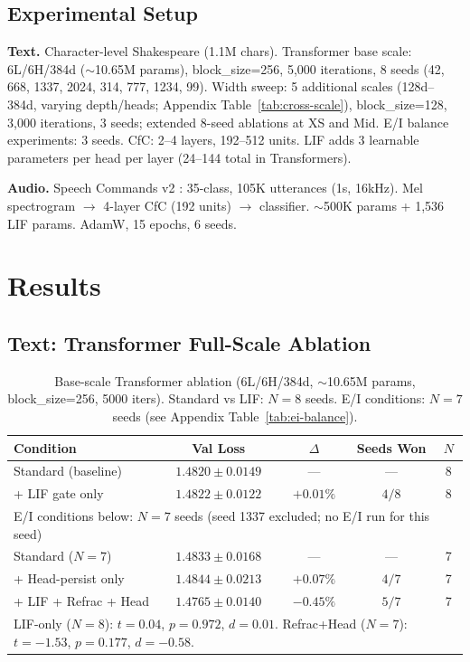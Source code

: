 \documentclass[11pt]{article}
\begin{document}
\subsection{Experimental Setup}

\textbf{Text.} Character-level Shakespeare (1.1M chars). Transformer base scale: 6L/6H/384d ($\sim$10.65M params), block\_size=256, 5,000 iterations, 8 seeds (42, 668, 1337, 2024, 314, 777, 1234, 99). Width sweep: 5 additional scales (128d--384d, varying depth/heads; Appendix Table~\ref{tab:cross-scale}), block\_size=128, 3,000 iterations, 3 seeds; extended 8-seed ablations at XS and Mid. E/I balance experiments: 3 seeds. CfC: 2--4 layers, 192--512 units. LIF adds 3 learnable parameters per head per layer (24--144 total in Transformers).

\textbf{Audio.} Speech Commands v2 \cite{warden2018speech}: 35-class, 105K utterances (1s, 16kHz). Mel spectrogram $\to$ 4-layer CfC (192 units) $\to$ classifier. $\sim$500K params + 1,536 LIF params. AdamW, 15 epochs, 6 seeds.


\section{Results}

\subsection{Text: Transformer Full-Scale Ablation}
\label{sec:text-results}

\begin{table}[h]
\centering
\caption{Base-scale Transformer ablation (6L/6H/384d, $\sim$10.65M params, block\_size=256, 5000 iters). Standard vs LIF: $N{=}8$ seeds. E/I conditions: $N{=}7$ seeds (see Appendix Table~\ref{tab:ei-balance}).}
\label{tab:full-ablation}
\begin{tabular}{lcccc}
\toprule
\textbf{Condition} & \textbf{Val Loss} & \textbf{$\Delta$} & \textbf{Seeds Won} & \textbf{$N$} \\
\midrule
Standard (baseline) & $1.4820 \pm 0.0149$ & --- & --- & 8 \\
+ LIF gate only & $1.4822 \pm 0.0122$ & $+0.01\%$ & $4/8$ & 8 \\
\midrule
\multicolumn{5}{l}{\footnotesize E/I conditions below: $N{=}7$ seeds (seed 1337 excluded; no E/I run for this seed)} \\
Standard ($N{=}7$) & $1.4833 \pm 0.0168$ & --- & --- & 7 \\
+ Head-persist only & $1.4844 \pm 0.0213$ & $+0.07\%$ & $4/7$ & 7 \\
+ LIF + Refrac + Head & $1.4765 \pm 0.0140$ & $-0.45\%$ & $5/7$ & 7 \\
\bottomrule
\multicolumn{5}{l}{\footnotesize LIF-only ($N{=}8$): $t = 0.04$, $p = 0.972$, $d = 0.01$. Refrac+Head ($N{=}7$): $t = -1.53$, $p = 0.177$, $d = -0.58$.} \\
\end{tabular}
\end{table}
\end{document}
